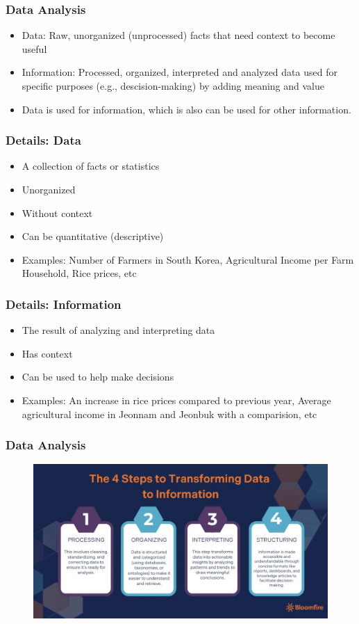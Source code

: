 \documentclass[
	11pt, %
]{beamer}
\begin{document}
\begin{frame}
	\frametitle{Data Analysis}
		\begin{itemize}
			\item Data: Raw, unorganized (unprocessed) facts that need context to become useful
			\item Information: Processed, organized, interpreted and analyzed data used for specific purposes (e.g., descision-making) by adding meaning and value
			\item Data is used for information, which is also can be used for other information.
		\end{itemize}
\end{frame}

\begin{frame}
	\frametitle{Details: Data}
		\begin{itemize}
			\item A collection of facts or statistics
			\item Unorganized
			\item Without context
			\item Can be quantitative (descriptive)
			\item Examples: Number of Farmers in South Korea, Agricultural Income per Farm Household, Rice prices, etc
		\end{itemize}
\end{frame}

\begin{frame}
	\frametitle{Details: Information}
		\begin{itemize}
			\item The result of analyzing and interpreting data
			\item Has context
			\item Can be used to help make decisions
			\item Examples: An increase in rice prices compared to previous year, Average agricultural income in Jeonnam and Jeonbuk with a comparision, etc
		\end{itemize}
\end{frame}

\begin{frame}
	\frametitle{Data Analysis}
	\begin{figure}
		\includegraphics[width=0.8\linewidth]{images/figure13.png}
		\label{fig:https://bloomfire.com/}
	\end{figure}
\end{frame}






\end{document}
